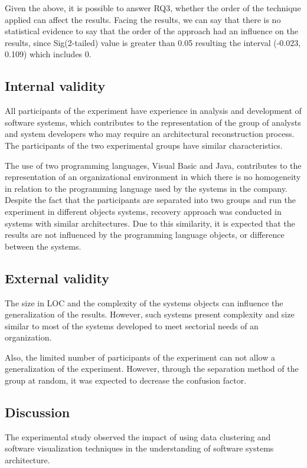 \documentclass{sig-alternate-05-2015}
\begin{document}
Given the above, it is possible to answer RQ3, whether the order of the technique applied can affect the results. Facing the results, we can say that there is no statistical evidence to say that the order of the approach had an influence on the results, since Sig(2-tailed) value is greater than 0.05 resulting the interval (-0.023, 0.109) which includes 0.

\subsection{Internal validity}%

All participants of the experiment have experience in analysis and development of software systems, which contributes to the representation of the group of analysts and system developers who may require an architectural reconstruction process. The participants of the two experimental groups have similar characteristics.

The use of two programming languages, Visual Basic and Java, contributes to the representation of an organizational environment in which there is no homogeneity in relation to the programming language used by the systems in the company. Despite the fact that the participants are separated into two groups and run the experiment in different objects systems, recovery approach was conducted in systems with similar architectures. Due to this similarity, it is expected that the results are not influenced by the programming language objects, or difference between the systems.

\subsection{External validity}%
The size in LOC and the complexity of the systems objects can influence the generalization of the results. However, such systems present complexity and size similar to most of the systems developed to meet sectorial needs of an organization. 

Also, the limited number of participants of the experiment can not allow a generalization of the experiment. However, through the separation method of the group at random, it was expected to decrease the confusion factor.

\subsection{Discussion}

The experimental study observed the impact of using data clustering and software visualization techniques in the understanding of software systems architecture.
\end{document}
